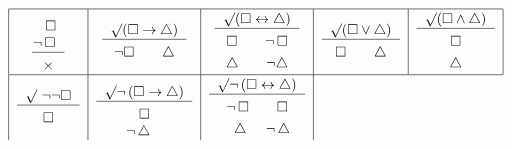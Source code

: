 \documentclass[letterpaper, 11pt]{article}
\theoremstyle{definition}
\begin{document}
{\small
\[\begin{tabular}{|c|c|c|c|c|}
\hline
\begin{tabular}{c}
\rule{0pt}{15pt}
$\square$\\
\hspace{-6pt}$\neg\, \square$\\ \hline
$\rule{0pt}{12pt}\times$
\end{tabular}
&
\begin{tabular}{c}
$\surd (\square\to\triangle)$\\ \hline
$\rule{0pt}{12pt}\neg\square \quad\quad \triangle$
\end{tabular}
&
\begin{tabular}{c}
$\surd (\square\leftrightarrow\triangle)$\\ \hline
$\rule{0pt}{12pt}\square \quad\quad  \neg\,\square$\\
$\rule{0pt}{12pt}\triangle \quad\quad  \neg\triangle$
\end{tabular}
&
\begin{tabular}{c}
$\surd (\square\vee\triangle)$\\ \hline
$\rule{0pt}{12pt}\square \quad\quad \triangle$
\end{tabular}
&
\begin{tabular}{c}
$\surd (\square\wedge\triangle)$\\ \hline
$\rule{0pt}{12pt}\square$\\
$\rule{0pt}{12pt}\triangle$\\
\end{tabular}
\\\hline %
\begin{tabular}{c}
$\surd\ \neg \neg \square$\\ \hline
$\rule{0pt}{12pt}\square$
\end{tabular}
&
\begin{tabular}{c}
\rule{0pt}{15pt}$\surd \neg\,(\square\to\triangle)$\\ \hline
$\rule{0pt}{12pt}\square$\\
$\hspace{-9pt}\neg\,\triangle$
\end{tabular}
&
\begin{tabular}{c}
$\surd \neg\,(\square\leftrightarrow\triangle)$\\ \hline
$\rule{0pt}{12pt}\neg\,\square \quad\quad \square$\\
$\rule{0pt}{12pt}\hspace{7pt}\triangle \hspace{14pt} \neg\,\triangle$\\

\end{tabular}
\end{tabular}\]}
\end{document}
